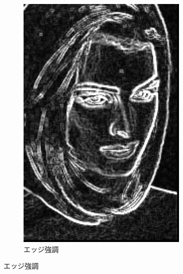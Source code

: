 \documentclass[a4paper,12pt]{jsarticle}
\begin{document}
\begin{figure}[!htbp]
\begin{subfigure}[b]{0.45\textwidth}
    \includegraphics[width=0.9\textwidth]{./images/edge_enhanced_sample6_edge.png}
    \caption{エッジ強調}
\end{subfigure}


\end{figure}
\end{document}

